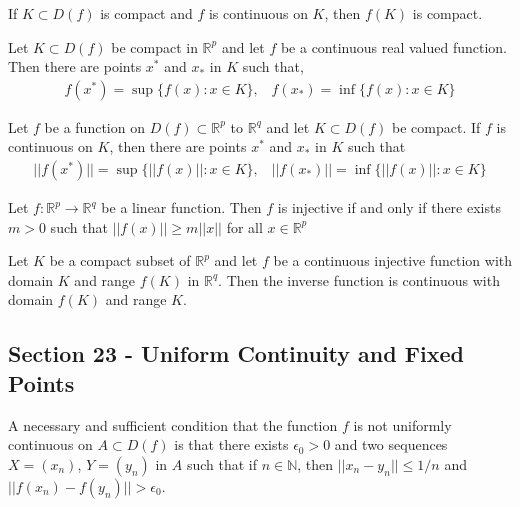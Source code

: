 \documentclass[12pt]{article}
\newcommand{\N}{\mathbb{N}}
\newcommand{\R}{\mathbb{R}}
\newenvironment{theorem}[2][Theorem]{\begin{trivlist}
\item[\hskip \labelsep {\bfseries #1}\hskip \labelsep {\bfseries #2.}]}{\end{trivlist}}
\newenvironment{lemma}[2][Lemma]{\begin{trivlist}
\item[\hskip \labelsep {\bfseries #1}\hskip \labelsep {\bfseries #2.}]}{\end{trivlist}}
\newenvironment{corollary}[2][Corollary]{\begin{trivlist}
\item[\hskip \labelsep {\bfseries #1}\hskip \labelsep {\bfseries #2.}]}{\end{trivlist}}
\begin{document}
\begin{theorem}[Preservation of]{Compactness}
If $K \subset D(f)$ is compact and $f$ is continuous on $K$, then $f(K)$ is compact.
\end{theorem}

\begin{theorem}[Maximum and Minimum Value]{Theorem}
Let $K \subset D(f)$ be compact in $\R^p$ and let $f$ be a continuous real valued function. Then there are points $x^*$ and $x_*$ in $K$ such that,
\begin{align*}
f(x^*) = \sup \{f(x): x \in K\}, \; \; \; f(x_*) = \inf \{f(x): x \in K\}
\end{align*}
\end{theorem}

\begin{corollary}{22.7}
Let $f$ be a function on $D(f) \subset \R^p$ to $\R^q$ and let $K \subset D(f)$ be compact. If $f$ is continuous on $K$, then there are points $x^*$ and $x_*$ in $K$ such that
\begin{align*}
||f(x^*)|| = \sup \{||f(x)||: x \in K\}, \; \; \; ||f(x_*)|| = \inf \{||f(x)||: x \in K\}
\end{align*}
\end{corollary}

\begin{corollary}{22.8}
Let $f: \R^p \to \R^q$ be a linear function. Then $f$ is injective if and only if there exists $m > 0$ such that $||f(x)|| \geq m||x||$ for all $x \in \R^p$
\end{corollary}

\begin{theorem}[Continuity of the Inverse]{Function}
Let $K$ be a compact subset of $\R^p$ and let $f$ be a continuous injective function with domain $K$ and range $f(K)$ in $\R^q$. Then the inverse function is continuous with domain $f(K)$ and range $K$.
\end{theorem}

\subsection*{Section 23 - Uniform Continuity and Fixed Points}

\begin{lemma}{23.2}
A necessary and sufficient condition that the function $f$ is not uniformly continuous on $A \subset D(f)$ is that there exists $\epsilon_0 > 0$ and two sequences $X = (x_n)$, $Y = (y_n)$ in $A$ such that if $n \in \N$, then $||x_n - y_n|| \leq 1/n$ and $||f(x_n) - f(y_n)|| > \epsilon_0$.
\end{lemma}
\end{document}
